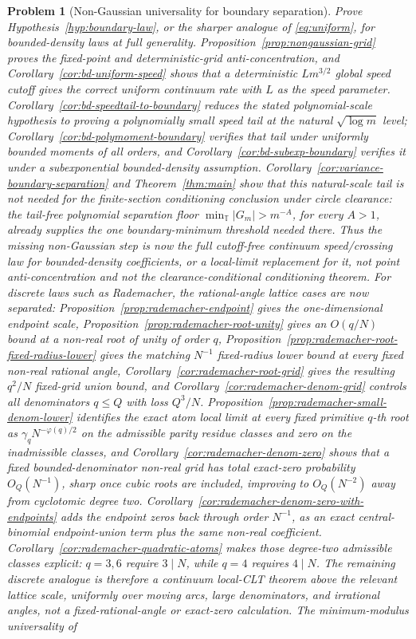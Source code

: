 \documentclass[11pt]{amsart}
\numberwithin{equation}{section}
\newtheorem{problem}[theorem]{Problem}
\theoremstyle{definition}
\theoremstyle{remark}
\newcommand{\T}{\mathbb T}
\newcommand{\abs}[1]{\left\lvert #1\right\rvert}
\begin{document}
\begin{problem}[Non-Gaussian universality for boundary separation]\label{prob:bernoulli}
Prove Hypothesis~\ref{hyp:boundary-law}, or the sharper analogue of \eqref{eq:uniform}, for bounded-density laws at full generality. Proposition~\ref{prop:nongaussian-grid} proves the fixed-point and deterministic-grid anti-concentration, and Corollary~\ref{cor:bd-uniform-speed} shows that a deterministic \(Lm^{3/2}\) global speed cutoff gives the correct uniform continuum rate with \(L\) as the speed parameter. Corollary~\ref{cor:bd-speedtail-to-boundary} reduces the stated polynomial-scale hypothesis to proving a polynomially small speed tail at the natural \(\sqrt{\log m}\) level; Corollary~\ref{cor:bd-polymoment-boundary} verifies that tail under uniformly bounded moments of all orders, and Corollary~\ref{cor:bd-subexp-boundary} verifies it under a subexponential bounded-density assumption. Corollary~\ref{cor:variance-boundary-separation} and Theorem~\ref{thm:main} show that this natural-scale tail is not needed for the finite-section conditioning conclusion under circle clearance: the tail-free polynomial separation floor \(\min_{\T}\abs{G_m}>m^{-A}\), for every \(A>1\), already supplies the one boundary-minimum threshold needed there. Thus the missing non-Gaussian step is now the full cutoff-free continuum speed/crossing law for bounded-density coefficients, or a local-limit replacement for it, not point anti-concentration and not the clearance-conditional conditioning theorem. For discrete laws such as Rademacher, the rational-angle lattice cases are now separated: Proposition~\ref{prop:rademacher-endpoint} gives the one-dimensional endpoint scale, Proposition~\ref{prop:rademacher-root-unity} gives an \(O(q/N)\) bound at a non-real root of unity of order \(q\), Proposition~\ref{prop:rademacher-root-fixed-radius-lower} gives the matching \(N^{-1}\) fixed-radius lower bound at every fixed non-real rational angle, Corollary~\ref{cor:rademacher-root-grid} gives the resulting \(q^2/N\) fixed-grid union bound, and Corollary~\ref{cor:rademacher-denom-grid} controls all denominators \(q\le Q\) with loss \(Q^3/N\). Proposition~\ref{prop:rademacher-small-denom-lower} identifies the exact atom local limit at every fixed primitive \(q\)-th root as \(\gamma_qN^{-\varphi(q)/2}\) on the admissible parity residue classes and zero on the inadmissible classes, and Corollary~\ref{cor:rademacher-denom-zero} shows that a fixed bounded-denominator non-real grid has total exact-zero probability \(O_Q(N^{-1})\), sharp once cubic roots are included, improving to \(O_Q(N^{-2})\) away from cyclotomic degree two. Corollary~\ref{cor:rademacher-denom-zero-with-endpoints} adds the endpoint zeros back through order \(N^{-1}\), as an exact central-binomial endpoint-union term plus the same non-real coefficient. Corollary~\ref{cor:rademacher-quadratic-atoms} makes those degree-two admissible classes explicit: \(q=3,6\) require \(3\mid N\), while \(q=4\) requires \(4\mid N\). The remaining discrete analogue is therefore a continuum local-CLT theorem above the relevant lattice scale, uniformly over moving arcs, large denominators, and irrational angles, not a fixed-rational-angle or exact-zero calculation. The minimum-modulus universality of 
\end{problem}
\end{document}
